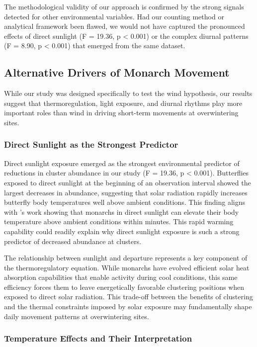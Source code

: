 The methodological validity of our approach is confirmed by the strong signals detected for other environmental variables. Had our counting method or analytical framework been flawed, we would not have captured the pronounced effects of direct sunlight (F = 19.36, p < 0.001) or the complex diurnal patterns (F = 8.90, p < 0.001) that emerged from the same dataset.

\subsection{Alternative Drivers of Monarch Movement}

While our study was designed specifically to test the wind hypothesis, our results suggest that thermoregulation, light exposure, and diurnal rhythms play more important roles than wind in driving short-term movements at overwintering sites.

\subsubsection{Direct Sunlight as the Strongest Predictor}

Direct sunlight exposure emerged as the strongest environmental predictor of reductions in cluster abundance in our study (F = 19.36, p < 0.001). Butterflies exposed to direct sunlight at the beginning of an observation interval showed the largest decreases in abundance, suggesting that solar radiation rapidly increases butterfly body temperatures well above ambient conditions. This finding aligns with \citeauthor{Masters1988_ACNENTPT}'s work showing that monarchs in direct sunlight can elevate their body temperature above ambient conditions within minutes. This rapid warming capability could readily explain why direct sunlight exposure is such a strong predictor of decreased abundance at clusters.

The relationship between sunlight and departure represents a key component of the thermoregulatory equation. While monarchs have evolved efficient solar heat absorption capabilities that enable activity during cool conditions, this same efficiency forces them to leave energetically favorable clustering positions when exposed to direct solar radiation. This trade-off between the benefits of clustering and the thermal constraints imposed by solar exposure may fundamentally shape daily movement patterns at overwintering sites.

\subsubsection{Temperature Effects and Their Interpretation}

